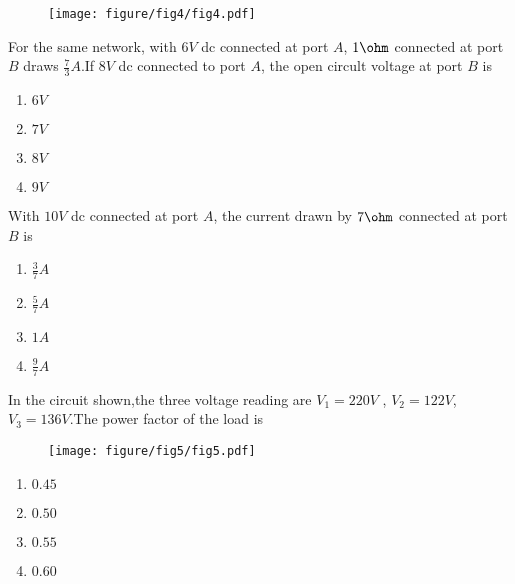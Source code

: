 \begin{figure}[h!]
        \centering
        \texttt{[image: figure/fig4/fig4.pdf]}
		\caption{}
        \label{stemplot}
\end{figure}
\item For the same network, with $6 V$ dc connected at port $A$, $1\ohm$ connected at port $B$ draws $\frac{7}{3} A$.If $8 V$ dc connected to port $A$, the open circult voltage at port $B$ is 
\begin{enumerate}
    \item$6 V$\\
    \item$7 V$\\
    \item$8 V$\\
    \item$9 V$
    \end{enumerate}
    \item With $10 V$ dc connected at port $A$, the current drawn by $7\ohm$ connected at port $B$ is
    \begin{enumerate}
        \item$\frac{3}{7}A$\\
         \item$\frac{5}{7}A$\\
        \item$1 A$\\
        \item$\frac{9}{7}A$
    \end{enumerate}
    \item In the circuit shown,the three voltage reading are $V_{1} = 220 V$ , $V_{2} = 122 V$, $V_{3} = 136 V$.The power factor of the load is\\
 \begin{figure}[h!]
        \centering
        \texttt{[image: figure/fig5/fig5.pdf]}
		\caption{}
        \label{stemplot}
\end{figure}
\begin{enumerate}
    \item$0.45$\\
    \item$0.50$\\
    \item$0.55$\\
    \item$0.60$
\end{enumerate}


   
